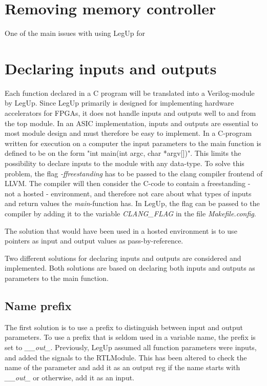 



\section{Removing memory controller}
One of the main issues with using LegUp for 

\section{\label{subsec:inoutdecl}Declaring inputs and outputs}
Each function declared in a C program will be translated into a Verilog-module by LegUp. Since LegUp primarily is designed for implementing hardware accelerators for FPGAs, it does not handle inputs and outputs well to and from the top module. In an ASIC implementation, inputs and outputs are essential to most module design and must therefore be easy to implement. In a C-program written for execution on a computer the input parameters to the main function is defined to be on the form "int main(int argc, char *argv[])". This limits the possibility to declare inputs to the module with any data-type. To solve this problem, the flag \textit{-ffreestanding} has to be passed to the clang compiler frontend of LLVM. The compiler will then consider the C-code to contain a freestanding - not a hosted - environment, and therefore not care about what types of inputs and return values the \textit{main}-function has. In LegUp, the flag can be passed to the compiler by adding it to the variable \textit{CLANG\_FLAG} in the file \textit{Makefile.config}.

The solution that would have been used in a hosted environment is to use pointers as input and output values as pass-by-reference.

Two different solutions for declaring inputs and outputs are considered and implemented. Both solutions are based on declaring both inputs and outputs as parameters to the main function.
\subsection{Name prefix}
The first solution is to use a prefix to distinguish between input and output parameters. To use a prefix that is seldom used in a variable name, the prefix is set to \textit{\_\_out\_}. Previously, LegUp assumed all function parameters were inputs, and added the signals to the RTLModule. This has been altered to check the name of the parameter and add it as an output reg if the name starts with \textit{\_\_out\_} or otherwise, add it as an input.

